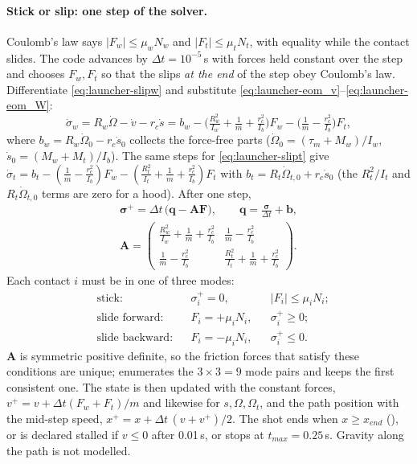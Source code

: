 \paragraph{Stick or slip: one step of the solver.} Coulomb's law says $|F_w| \le \mu_w N_w$ and
$|F_t| \le \mu_t N_t$, with equality while the contact slides. The code advances by $\Delta t = 10^{-5}$\,\unit{s}\assumed{}
with forces held constant over the step and chooses $F_w, F_t$ so that the slips \emph{at the end} of the
step obey Coulomb's law. Differentiate \eqref{eq:launcher-slipw} and substitute
\eqref{eq:launcher-eom_v}--\eqref{eq:launcher-eom_W}:
\begin{equation}
  \dot\sigma_w = R_w\dot\Omega - \dot v - r_c\dot s
  = b_w - \Big(\tfrac{R_w^2}{I_w} + \tfrac{1}{m} + \tfrac{r_c^2}{I_b}\Big)F_w
         - \Big(\tfrac{1}{m} - \tfrac{r_c^2}{I_b}\Big)F_t ,
  \label{eq:launcher-sigdot_w}
\end{equation}
where $b_w = R_w\dot\Omega_0 - r_c\dot s_0$ collects the force-free parts
($\dot\Omega_0 = (\tau_m + M_w)/I_w$, $\dot s_0 = (M_w + M_t)/I_b$). The same steps for
\eqref{eq:launcher-slipt} give $\dot\sigma_t = b_t - (\tfrac1m - \tfrac{r_c^2}{I_b})F_w -
(\tfrac{R_t^2}{I_t} + \tfrac1m + \tfrac{r_c^2}{I_b})F_t$ with $b_t = R_t\dot\Omega_{t,0} + r_c\dot s_0$
(the $R_t^2/I_t$ and $R_t\dot\Omega_{t,0}$ terms are zero for a hood). After one step,
\begin{gather}
  \bm{\sigma}^{+} = \Delta t\,\big(\mathbf{q} - \mathbf{A}\mathbf{F}\big),\qquad
  \mathbf{q} = \frac{\bm{\sigma}}{\Delta t} + \mathbf{b}, \nonumber\\
  \mathbf{A} = \begin{pmatrix}
     \frac{R_w^2}{I_w} + \frac1m + \frac{r_c^2}{I_b} & \frac1m - \frac{r_c^2}{I_b}\\[2pt]
     \frac1m - \frac{r_c^2}{I_b} & \frac{R_t^2}{I_t} + \frac1m + \frac{r_c^2}{I_b}
  \end{pmatrix}.
  \label{eq:launcher-lcp}
\end{gather}
Each contact $i$ must be in one of three modes:
\begin{equation}
  \begin{aligned}
  &\text{stick:} && \sigma_i^{+} = 0, && |F_i| \le \mu_i N_i;\\
  &\text{slide forward:} && F_i = +\mu_i N_i, && \sigma_i^{+} \ge 0;\\
  &\text{slide backward:} && F_i = -\mu_i N_i, && \sigma_i^{+} \le 0 .
  \end{aligned}
  \label{eq:launcher-modes}
\end{equation}
$\mathbf{A}$ is symmetric positive definite, so the friction forces that satisfy these conditions are unique;
 enumerates the $3\times3 = 9$ mode pairs and keeps the first consistent one. The state is then updated with the constant forces,
$v^{+} = v + \Delta t(F_w + F_t)/m$ and likewise for $s,\Omega,\Omega_t$, and the path position with the
mid-step speed, $x^{+} = x + \Delta t\,(v + v^{+})/2$. The shot ends when $x \ge x_{end}$
(), or is declared stalled if $v \le 0$ after 0.01\,\unit{s}\assumed, or stops at
$t_{max} = 0.25$\,\unit{s}\assumed. Gravity along the path is not modelled.

